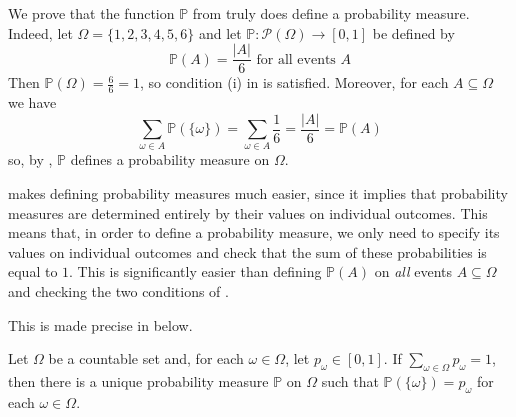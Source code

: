 \begin{example}
\label{exProbabilitySpaceSixSidedDieVerifyMeasure}
We prove that the function $\mathbb{P}$ from  truly does define a probability measure. Indeed, let $\Omega = \{ 1, 2, 3, 4, 5, 6 \}$ and let $\mathbb{P} : \mathcal{P}(\Omega) \to [0,1]$ be defined by
\[ \mathbb{P}(A) = \frac{|A|}{6} \text{ for all events } A \]
Then $\mathbb{P}(\Omega) = \frac{6}{6} = 1$, so condition (i) in  is satisfied. Moreover, for each $A \subseteq \Omega$ we have
\[ \sum_{\omega \in A} \mathbb{P}(\{\omega\}) = \sum_{\omega \in A} \frac{1}{6} = \frac{|A|}{6} = \mathbb{P}(A) \]
so, by , $\mathbb{P}$ defines a probability measure on $\Omega$.
\end{example}

 makes defining probability measures much easier, since it implies that probability measures are determined entirely by their values on individual outcomes. This means that, in order to define a probability measure, we only need to specify its values on individual outcomes and check that the sum of these probabilities is equal to $1$. This is significantly easier than defining $\mathbb{P}(A)$ on \textit{all} events $A \subseteq \Omega$ and checking the two conditions of .

This is made precise in  below.

\begin{proposition}
\label{propProbabilityMeasureDeterminedByIndividualOutcomes}
Let $\Omega$ be a countable set and, for each $\omega \in \Omega$, let $p_{\omega} \in [0,1]$. If $\sum_{\omega \in \Omega} p_{\omega} = 1$, then there is a unique probability measure $\mathbb{P}$ on $\Omega$ such that $\mathbb{P}(\{ \omega \}) = p_{\omega}$ for each $\omega \in \Omega$.
\end{proposition}

